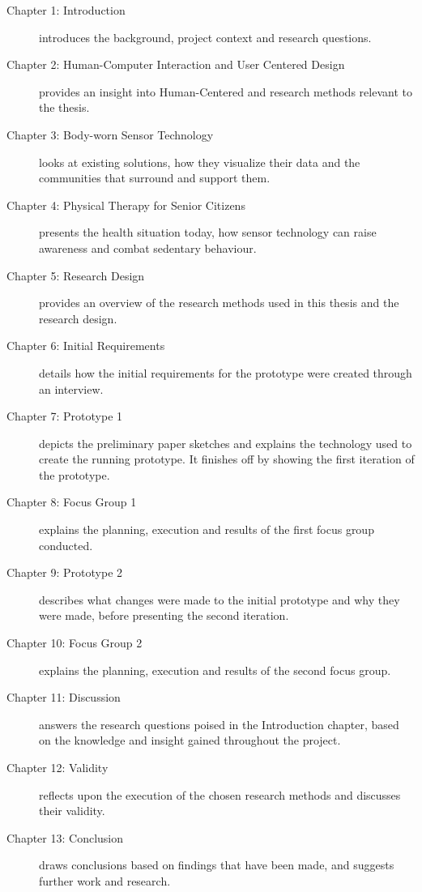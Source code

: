 \begin{description}
  \item[Chapter 1: Introduction] introduces the background, project context and research questions.
  \item[Chapter 2: Human-Computer Interaction and User Centered Design] provides an insight into Human-Centered and research methods relevant to the thesis.
  \item[Chapter 3: Body-worn Sensor Technology] looks at existing solutions, how they visualize their data and the communities that surround and support them.
  \item[Chapter 4: Physical Therapy for Senior Citizens] presents the health situation today, how sensor technology can raise awareness and combat sedentary behaviour.
  \item[Chapter 5: Research Design] provides an overview of the research methods used in this thesis and the research design.
  \item[Chapter 6: Initial Requirements] details how the initial requirements for the prototype were created through an interview.
  \item[Chapter 7: Prototype 1] depicts the preliminary paper sketches and explains the technology used to create the running prototype. It finishes off by showing the first iteration of the prototype.
  \item[Chapter 8: Focus Group 1] explains the planning, execution and results of the first focus group conducted.
  \item[Chapter 9: Prototype 2] describes what changes were made to the initial prototype and why they were made, before presenting the second iteration.
  \item[Chapter 10: Focus Group 2] explains the planning, execution and results of the second focus group.
  \item[Chapter 11: Discussion] answers the research questions poised in the Introduction chapter, based on the knowledge and insight gained throughout the project.
  \item[Chapter 12: Validity] reflects upon the execution of the chosen research methods and discusses their validity.
  \item[Chapter 13: Conclusion] draws conclusions based on findings that have been made, and suggests further work and research.
\end{description}

